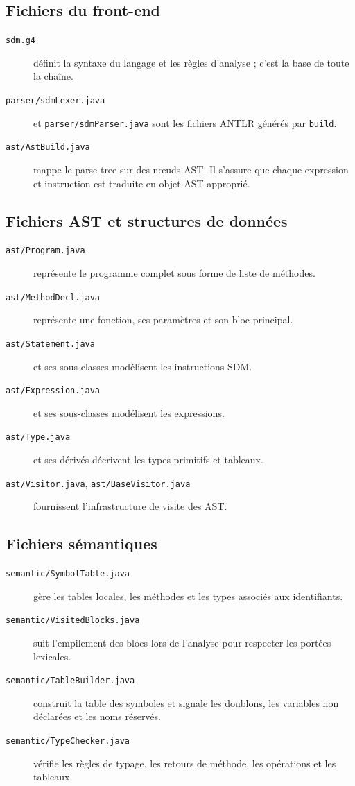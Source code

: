 \documentclass[a4paper,11pt]{article}
\begin{document}
\subsection{Fichiers du front-end}
\begin{description}
  \item[\texttt{sdm.g4}] définit la syntaxe du langage et les règles d'analyse ; c'est la base de toute la chaîne.
  \item[\texttt{parser/sdmLexer.java}] et \texttt{parser/sdmParser.java} sont les fichiers ANTLR générés par \texttt{build}.
  \item[\texttt{ast/AstBuild.java}] mappe le parse tree sur des nœuds AST. Il s'assure que chaque expression et instruction est traduite en objet AST approprié.
\end{description}

\subsection{Fichiers AST et structures de données}
\begin{description}
  \item[\texttt{ast/Program.java}] représente le programme complet sous forme de liste de méthodes.
  \item[\texttt{ast/MethodDecl.java}] représente une fonction, ses paramètres et son bloc principal.
  \item[\texttt{ast/Statement.java}] et ses sous-classes modélisent les instructions SDM.
  \item[\texttt{ast/Expression.java}] et ses sous-classes modélisent les expressions.
  \item[\texttt{ast/Type.java}] et ses dérivés décrivent les types primitifs et tableaux.
  \item[\texttt{ast/Visitor.java}, \texttt{ast/BaseVisitor.java}] fournissent l'infrastructure de visite des AST.
\end{description}

\subsection{Fichiers sémantiques}
\begin{description}
  \item[\texttt{semantic/SymbolTable.java}] gère les tables locales, les méthodes et les types associés aux identifiants.
  \item[\texttt{semantic/VisitedBlocks.java}] suit l'empilement des blocs lors de l'analyse pour respecter les portées lexicales.
  \item[\texttt{semantic/TableBuilder.java}] construit la table des symboles et signale les doublons, les variables non déclarées et les noms réservés.
  \item[\texttt{semantic/TypeChecker.java}] vérifie les règles de typage, les retours de méthode, les opérations et les tableaux.
\end{description}
\end{document}
